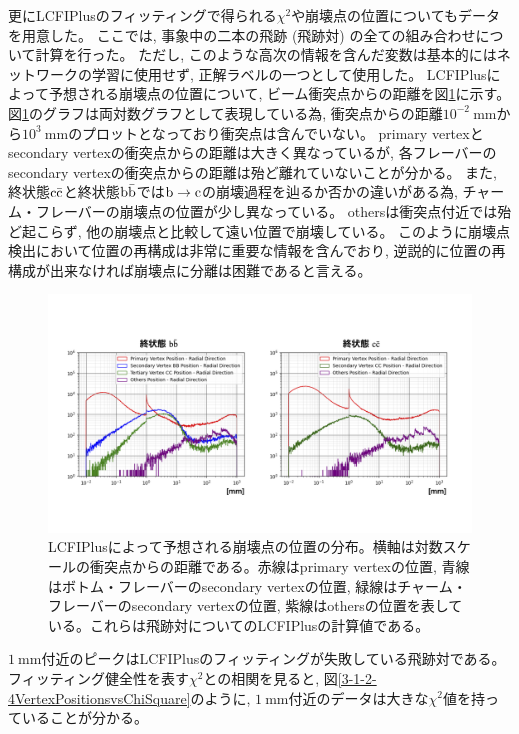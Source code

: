 更にLCFIPlusのフィッティングで得られる$\chi^2$や崩壊点の位置についてもデータを用意した。
ここでは, 事象中の二本の飛跡 (飛跡対) の全ての組み合わせについて計算を行った。
ただし, このような高次の情報を含んだ変数は基本的にはネットワークの学習に使用せず, 正解ラベルの一つとして使用した。
LCFIPlusによって予想される崩壊点の位置について, ビーム衝突点からの距離を図\ref{3-1-2-3VertexPositions}に示す。
図\ref{3-1-2-3VertexPositions}のグラフは両対数グラフとして表現している為, 衝突点からの距離$10^{-2}\ \mathrm{mm}$から$10^{3}\ \mathrm{mm}$のプロットとなっており衝突点は含んでいない。
primary vertexとsecondary vertexの衝突点からの距離は大きく異なっているが, 各フレーバーのsecondary vertexの衝突点からの距離は殆ど離れていないことが分かる。
また, 終状態$\rm c\bar{c}$と終状態$\rm b\bar{b}$では$\rm b \to c$の崩壊過程を辿るか否かの違いがある為, チャーム・フレーバーの崩壊点の位置が少し異なっている。
othersは衝突点付近では殆ど起こらず, 他の崩壊点と比較して遠い位置で崩壊している。
このように崩壊点検出において位置の再構成は非常に重要な情報を含んでおり, 逆説的に位置の再構成が出来なければ崩壊点に分離は困難であると言える。

\begin{figure}[htbp]
 \centering
 \includegraphics[trim = 50 100 50 150, width=1.0\textwidth, clip]{Figure/3Networks/3-1-2-3VertexPositions.png}
 \caption[LCFIPlusによって予想される崩壊点の位置の分布]{LCFIPlusによって予想される崩壊点の位置の分布。横軸は対数スケールの衝突点からの距離である。赤線はprimary vertexの位置, 青線はボトム・フレーバーのsecondary vertexの位置, 緑線はチャーム・フレーバーのsecondary vertexの位置, 紫線はothersの位置を表している。これらは飛跡対についてのLCFIPlusの計算値である。}
 \label{3-1-2-3VertexPositions}
\end{figure}

$1\ \mathrm{mm}$付近のピークはLCFIPlusのフィッティングが失敗している飛跡対である。
フィッティング健全性を表す$\chi^2$との相関を見ると, 図\ref{3-1-2-4VertexPositionsvsChiSquare}のように, $1\ \mathrm{mm}$付近のデータは大きな$\chi^2$値を持っていることが分かる。

